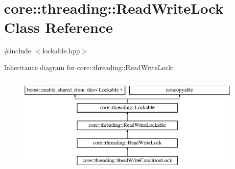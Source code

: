 \hypertarget{classcore_1_1threading_1_1_read_write_lock}{\section{core\-:\-:threading\-:\-:Read\-Write\-Lock Class Reference}
\label{classcore_1_1threading_1_1_read_write_lock}
}


{\ttfamily \#include $<$lockable.\-hpp$>$}

Inheritance diagram for core\-:\-:threading\-:\-:Read\-Write\-Lock\-:\begin{figure}[H]
\begin{center}
\leavevmode
\includegraphics[height=5.000000cm]{classcore_1_1threading_1_1_read_write_lock}
\end{center}
\end{figure}
